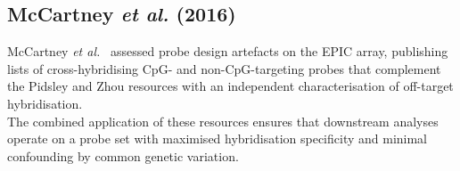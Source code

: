 \subsection{McCartney \textit{et al.} (2016)}
\label{app:mccartney2016}

McCartney \textit{et al.}~\cite{mccartney2016} assessed probe design artefacts
on the EPIC array, publishing lists of cross-hybridising CpG- and non-CpG-targeting
probes that complement the Pidsley and Zhou resources with an independent
characterisation of off-target hybridisation.\\


\noindent The combined application of these resources ensures that downstream analyses
operate on a probe set with maximised hybridisation specificity and minimal
confounding by common genetic variation.

